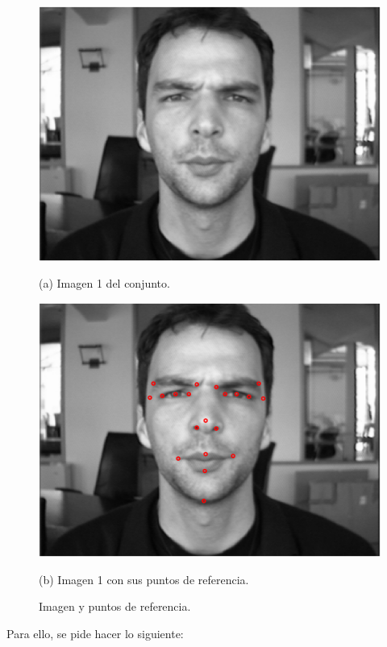 \documentclass[11pt, letterpaper]{article}
\begin{document}
\begin{figure}[h!]
	\centering
	\begin{minipage}{0.4\textwidth}
		\centering
		\includegraphics[width=\textwidth]{IMG/R0.png}
		\caption*{(a) Imagen 1 del conjunto.}
	\end{minipage}\hfill
	\begin{minipage}{0.4\textwidth}
		\centering
		\includegraphics[width=\textwidth]{IMG/R1.png}
		\caption*{(b) Imagen 1 con sus puntos de referencia.}
	\end{minipage}
	\caption{Imagen y puntos de referencia.}
	\label{fig:r0_r1}
\end{figure}

Para ello, se pide hacer lo siguiente:
\end{document}
